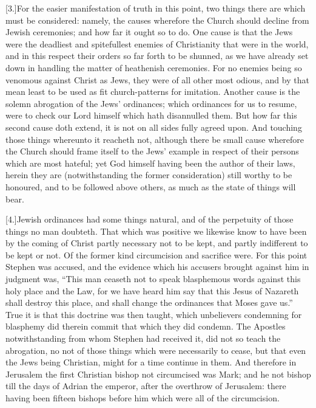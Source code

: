 [3.]For the easier manifestation of truth in this point, two things there are which must be considered: namely, the causes wherefore the Church should decline from Jewish ceremonies; and how far it ought so to do. One cause is that the Jews were the deadliest and spitefullest enemies of Christianity that were in the world, and in this respect their orders so far forth to be shunned, as we have already set down in handling the matter of heathenish ceremonies. For no enemies being so venomous against Christ as Jews, they were of all other most odious, and by that mean least to be used as fit church-patterns for imitation. Another cause is the solemn abrogation of the Jews’ ordinances; which ordinances for us to resume, were to check our Lord himself which hath disannulled them. But how far this second cause doth extend, it is not on all sides fully agreed upon. And touching those things whereunto it reacheth not, although there be small cause wherefore the Church should frame itself to the Jews’ example in respect of their persons which are most hateful; yet God himself having been the author of their laws, herein they are (notwithstanding the former consideration) still worthy to be honoured, and to be followed above others, as much as the state of things will bear.

[4.]Jewish ordinances had some things natural, and of the perpetuity of those things no man doubteth. That which was positive we likewise know to have been by the coming of Christ partly necessary not to be kept, and partly indifferent to be kept or not. Of the former kind circumcision and  sacrifice were. For this point Stephen was accused, and the evidence which his accusers brought against him in judgment was, “This man ceaseth not to speak blasphemous words against this holy place and the Law, for we have heard him say that this Jesus of Nazareth shall destroy this place, and shall change the ordinances that Moses gave us.” True it is that this doctrine was then taught, which unbelievers condemning for blasphemy did therein commit that which they did condemn. The Apostles notwithstanding from whom Stephen had received it, did not so teach the abrogation, no not of those things which were necessarily to cease, but that even the Jews being Christian, might for a time continue in them. And therefore in Jerusalem the first Christian bishop not circumcised was Mark; and he not bishop till the days of Adrian the emperor, after the overthrow of Jerusalem: there having been fifteen bishops before him which were all of the circumcision.

